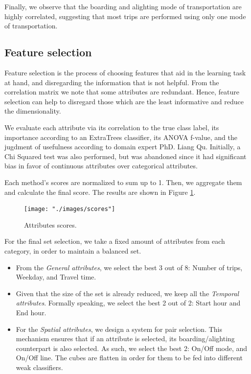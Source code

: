 \documentclass{article}
\begin{document}
Finally, we observe that the boarding and alighting mode of transportation are highly correlated, suggesting that most trips are performed using only one mode of transportation. 

\subsection{Feature selection}
Feature selection is the process of choosing features that aid in the learning task at hand, and disregarding the information that is not helpful. From the correlation matrix we note that some attributes are redundant. Hence, feature selection can help to disregard those which are the least informative and reduce the dimensionality.

We evaluate each attribute via its correlation to the true class label, its importance according to an ExtraTrees classifier, its ANOVA f-value, and the jugdment of usefulness according to domain expert PhD. Liang Qu. Initially, a Chi Squared test was also performed, but was abandoned since it had significant bias in favor of continuous attributes over categorical attributes. 

Each method's scores are normalized to sum up to 1. Then, we aggregate them and calculate the final score. The results are shown in Figure \ref{fig:classification/scores}. 

\begin{figure}[H]
  \centering
  \texttt{[image: "./images/scores"]}
  \caption{Attributes scores.}
  \label{fig:classification/scores}
\end{figure}

For the final set selection, we take a fixed amount of attributes from each category, in order to maintain a balanced set. 

\begin{itemize}

\item From the \textit{General attributes}, we select the best 3 out of 8: Number of trips, Weekday, and Travel time. 

\item Given that the size of the set is already reduced, we keep all the \textit{Temporal attributes}. Formally speaking, we select the best 2 out of 2: Start hour and End hour. 

\item For the \textit{Spatial attributes}, we design a system for pair selection. This mechanism ensures that if an attribute is selected, its boarding/alighting counterpart is also selected. As such, we select the best 2: On/Off mode, and On/Off line. The cubes are flatten in order for them to be fed into different weak classifiers. 

\end{itemize}
\end{document}
